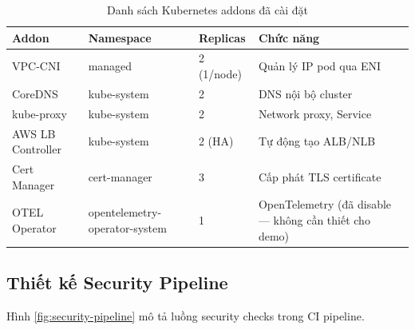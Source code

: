 \documentclass[13pt,a4paper,twoside]{extarticle}
\begin{document}
\begin{table}[H]
\centering
\begin{tabular}{@{}p{3cm} p{3cm} p{2.5cm} p{5.5cm}@{}}
\toprule
\textbf{Addon} & \textbf{Namespace} & \textbf{Replicas} & \textbf{Chức năng} \\
\midrule
VPC-CNI & managed & 2 (1/node) & Quản lý IP pod qua ENI \\
CoreDNS & kube-system & 2 & DNS nội bộ cluster \\
kube-proxy & kube-system & 2 & Network proxy, Service \\
AWS LB Controller & kube-system & 2 (HA) & Tự động tạo ALB/NLB \\
Cert Manager & cert-manager & 3 & Cấp phát TLS certificate \\
OTEL Operator & opentelemetry-operator-system & 1 & OpenTelemetry (đã disable — không cần thiết cho demo) \\
\bottomrule
\end{tabular}
\caption{Danh sách Kubernetes addons đã cài đặt}
\label{tab:addons}
\end{table}

\subsection{Thiết kế Security Pipeline}

Hình \ref{fig:security-pipeline} mô tả luồng security checks trong CI pipeline.
\end{document}
